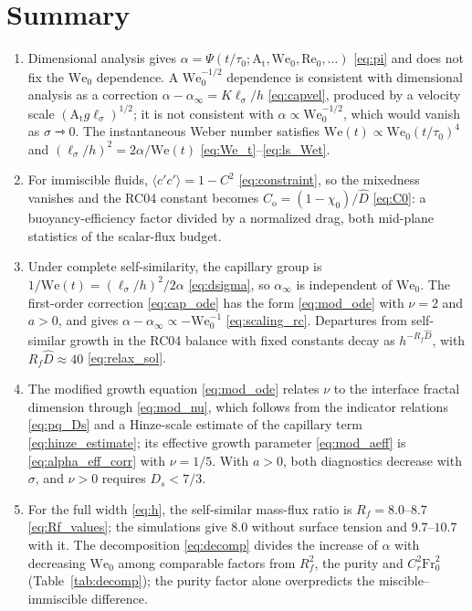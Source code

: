\documentclass[11pt]{article}
\numberwithin{equation}{section}
\newcommand{\avg}[1]{\langle #1\rangle}
\newcommand{\At}{\mathrm{A_t}}
\newcommand{\We}{\mathrm{We}_0}
\newcommand{\ls}{\ell_\sigma}
\begin{document}
\section{Summary}\label{sec:summary}
\begin{enumerate}
\item Dimensional analysis gives $\alpha = \Psi(t/\tau_0; \At, \We, \mathrm{Re}_0, \dots)$ \eqref{eq:pi} and does not fix the $\We$ dependence. A $\We^{-1/2}$ dependence is consistent with dimensional analysis as a correction $\alpha - \alpha_\infty = K \ls/h$ \eqref{eq:capvel}, produced by a velocity scale $(\At g \ls)^{1/2}$; it is not consistent with $\alpha \propto \We^{-1/2}$, which would vanish as $\sigma \rightarrowtriangle 0$. The instantaneous Weber number satisfies $\mathrm{We}(t) \propto \We(t/\tau_0)^4$ and $(\ls/h)^2 = 2 \alpha/\mathrm{We}(t)$ \eqref{eq:We_t}--\eqref{eq:ls_Wet}.
\item For immiscible fluids, $\avg{c' c'} = 1 - C^2$ \eqref{eq:constraint}, so the mixedness vanishes and the RC04 constant becomes $C_\mathrm{o} = (1 - \chi_0)/\hat D$ \eqref{eq:C0}: a buoyancy-efficiency factor divided by a normalized drag, both mid-plane statistics of the scalar-flux budget.
\item Under complete self-similarity, the capillary group is $1/\mathrm{We}(t) = (\ls/h)^2/2 \alpha$ \eqref{eq:dsigma}, so $\alpha_\infty$ is independent of $\We$. The first-order correction \eqref{eq:cap_ode} has the form \eqref{eq:mod_ode} with $\nu = 2$ and $a > 0$, and gives $\alpha - \alpha_\infty \propto -\We^{-1}$ \eqref{eq:scaling_rc}. Departures from self-similar growth in the RC04 balance with fixed constants decay as $h^{-R_f \hat D}$, with $R_f \hat D \approx 40$ \eqref{eq:relax_sol}.
\item The modified growth equation \eqref{eq:mod_ode} relates $\nu$ to the interface fractal dimension through \eqref{eq:mod_nu}, which follows from the indicator relations \eqref{eq:pq_Ds} and a Hinze-scale estimate of the capillary term \eqref{eq:hinze_estimate}; its effective growth parameter \eqref{eq:mod_aeff} is \eqref{eq:alpha_eff_corr} with $\nu = 1/5$. With $a > 0$, both diagnostics decrease with $\sigma$, and $\nu > 0$ requires $D_s < 7/3$.
\item For the full width \eqref{eq:h}, the self-similar mass-flux ratio is $R_f = 8.0$--$8.7$ \eqref{eq:Rf_values}; the simulations give $8.0$ without surface tension and $9.7$--$10.7$ with it. The decomposition \eqref{eq:decomp} divides the increase of $\alpha$ with decreasing $\We$ among comparable factors from $R_f^2$, the purity and $C_r^2 \mathrm{Fr}_0^2$ (Table~\ref{tab:decomp}); the purity factor alone overpredicts the miscible--immiscible difference.

\end{enumerate}
\end{document}
